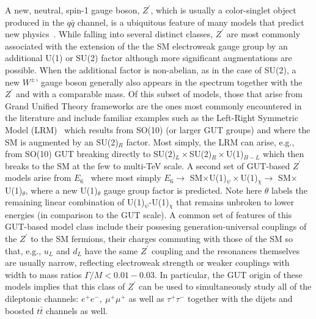 \documentclass[a4paper,11pt]{article}
\newcommand{\Zp}{\ensuremath{Z^{\prime}}}
\begin{document}
A new, neutral, spin-1 gauge boson, $\Zp$, which is usually a color-singlet object produced in the $q\bar q$ channel, is a ubiquitous feature of many models that predict new
physics~\cite{Langacker:2008yv,Rizzo:2006nw,Carena:2004xs,Salvioni:2009mt}.  While falling into several distinct classes, $\Zp$ are most commonly associated with the
extension of the the SM electroweak gauge group by an additional U(1) or SU(2) factor although more significant augmentations are possible. When the additional factor is non-abelian,
as in the case of SU(2), a new $W^\pm$' gauge boson generally also appears in the spectrum together with the $\Zp$ and with a comparable mass.  Of this subset of models, those
that arise from Grand Unified Theory frameworks are the ones most commonly encountered in the literature and include familiar examples such as the Left-Right Symmetric
Model (LRM)~\cite{Senjanovic:1975rk,Mohapatra:1980yp} which results from SO(10)
(or larger GUT groups) and where the SM is augmented by an SU(2)$_R$ factor. Most simply, the LRM can arise, e.g., from SO(10) GUT breaking directly to
SU(2)$_L \times$SU(2)$_R \times$U(1)$_{B-L}$ which then breaks to the SM at the few to multi-TeV scale. A second set of GUT-based $\Zp$ models arise from
$E_6$~\cite{Robinett:1982tq,London:1986dk,Hewett:1988xc,Joglekar:2016yap} where most simply $E_6 \rightarrow$ SM$\times$U(1)$_\psi \times$U(1)$_\chi \rightarrow $ SM$
\times$U(1)$_\theta$, where a new U(1)$_\theta$ gauge group factor is predicted. Note here $\theta$ labels the remaining linear combination of U(1)$_\psi$-U(1)$_\chi$ that remains
unbroken to lower energies (in comparison to the GUT scale).  A common set of features of this GUT-based model class include their possesing generation-universal couplings
of the $\Zp$ to the SM fermions, their charges commuting with those of the SM so that, e.g., $u_L$ and $d_L$ have the same $\Zp$ coupling and the resonances themselves are usually
narrow, reflecting electroweak strength or weaker couplings with width to mass ratios $\Gamma/M < 0.01-0.03$. In particular, the GUT origin of these models
implies that this class of $\Zp$ can be used to simultaneously study all of the dileptonic channels: $e^+e^-,~\mu^+\mu^+$ as well as $\tau^+\tau^-$ together with the dijets and boosted
$t\bar t$ channels as well.
\end{document}
